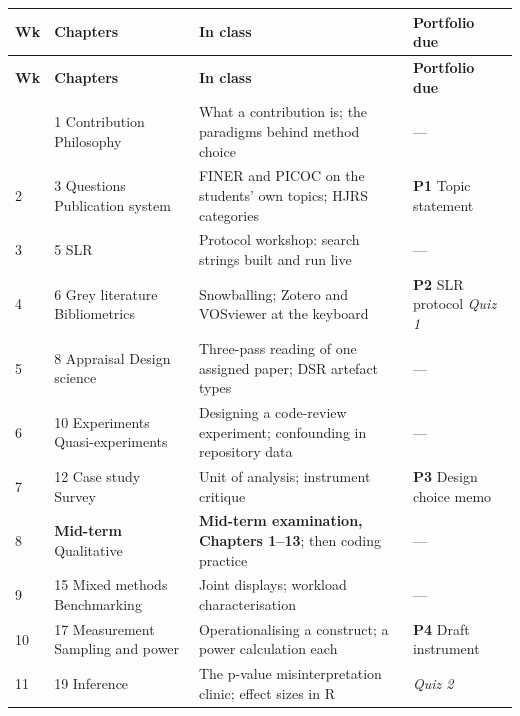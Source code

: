 \begin{center}
\small
\begin{longtable}{@{}L{1.2cm}L{4.0cm}L{5.0cm}L{3.9cm}@{}}
\toprule
\textbf{Wk} & \textbf{Chapters} & \textbf{In class} & \textbf{Portfolio due} \\
\midrule
\endfirsthead
\toprule
\textbf{Wk} & \textbf{Chapters} & \textbf{In class} & \textbf{Portfolio due} \\
\midrule
\endhead
\bottomrule
{} & 1 Contribution Philosophy
  & What a contribution is; the paradigms behind method choice
  & --- \\
2 & 3 Questions Publication system
  & FINER and PICOC on the students' own topics; HJRS categories
  & \textbf{P1} Topic statement \\
3 & 5 SLR
  & Protocol workshop: search strings built and run live
  & --- \\
4 & 6 Grey literature Bibliometrics
  & Snowballing; Zotero and VOSviewer at the keyboard
  & \textbf{P2} SLR protocol \newline \emph{Quiz 1} \\
5 & 8 Appraisal Design science
  & Three-pass reading of one assigned paper; DSR artefact types
  & --- \\
6 & 10 Experiments Quasi-experiments
  & Designing a code-review experiment; confounding in repository data
  & --- \\
7 & 12 Case study Survey
  & Unit of analysis; instrument critique
  & \textbf{P3} Design choice memo \\
8 & \textbf{Mid-term} Qualitative
  & \textbf{Mid-term examination, Chapters 1--13}; then coding practice
  & --- \\
9 & 15 Mixed methods Benchmarking
  & Joint displays; workload characterisation
  & --- \\
10 & 17 Measurement Sampling and power
  & Operationalising a construct; a power calculation each
  & \textbf{P4} Draft instrument \\
11 & 19 Inference
  & The p-value misinterpretation clinic; effect sizes in R
  & \emph{Quiz 2} \\

\end{longtable}
\end{center}
